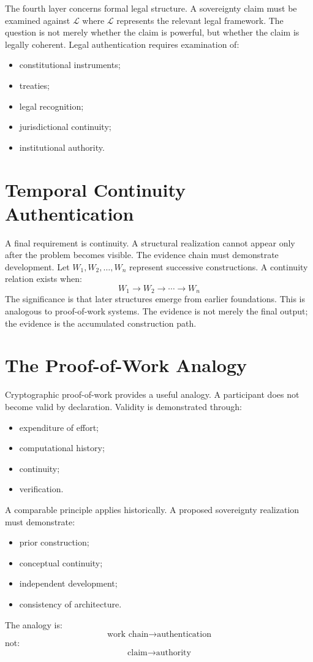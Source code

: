 \documentclass[11pt,openany]{book}
\theoremstyle{plain}
\theoremstyle{definition}
\begin{document}
The fourth layer concerns formal legal structure. A sovereignty claim must be examined against \(\mathcal{L}\) where \(\mathcal{L}\) represents the relevant legal framework. The question is not merely whether the claim is powerful, but whether the claim is legally coherent. Legal authentication requires examination of:
\begin{itemize}
\item constitutional instruments;
\item treaties;
\item legal recognition;
\item jurisdictional continuity;
\item institutional authority.
\end{itemize}

\section{Temporal Continuity Authentication}

A final requirement is continuity. A structural realization cannot appear only after the problem becomes visible. The evidence chain must demonstrate development. Let \(W_1, W_2, \ldots, W_n\) represent successive constructions. A continuity relation exists when:
\[
W_1 \longrightarrow W_2 \longrightarrow \cdots \longrightarrow W_n
\]
The significance is that later structures emerge from earlier foundations. This is analogous to proof-of-work systems. The evidence is not merely the final output; the evidence is the accumulated construction path.

\section{The Proof-of-Work Analogy}

Cryptographic proof-of-work provides a useful analogy. A participant does not become valid by declaration. Validity is demonstrated through:
\begin{itemize}
\item expenditure of effort;
\item computational history;
\item continuity;
\item verification.
\end{itemize}
A comparable principle applies historically. A proposed sovereignty realization must demonstrate:
\begin{itemize}
\item prior construction;
\item conceptual continuity;
\item independent development;
\item consistency of architecture.
\end{itemize}
The analogy is:
\[
\text{work chain} \longrightarrow \text{authentication}
\]
not:
\[
\text{claim} \longrightarrow \text{authority}
\]
\end{document}
